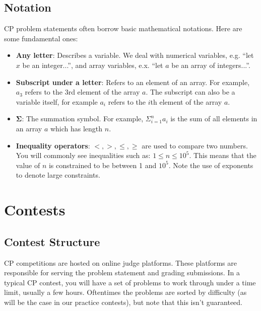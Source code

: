 \documentclass{article}
\begin{document}
\subsection {Notation}
CP problem statements often borrow basic mathematical notations. Here are some fundamental ones:
\begin{itemize}
    \item \textbf{Any letter}: Describes a variable. We deal with numerical variables, e.g. ``let $x$ be an integer...'', and array variables, e.x. ``let $a$ be an array of integers...''.
    \item \textbf{Subscript under a letter}: Refers to an element of an array. For example, $a_3$ refers to the 3rd element of the array $a$. The subscript can also be a variable itself, for example $a_i$ refers to the $i$th element of the array $a$.
    \item $\mathbf{\Sigma}$: The summation symbol. For example, $\Sigma_{i=1}^{n} a_i$ is the sum of all elements in an array $a$ which has length $n$.
    \item \textbf{Inequality operators}: $<, >, \leq, \geq$ are used to compare two numbers. You will commonly see inequalities such as: $1\leq n\leq 10^5$. This means that the value of $n$ is constrained to be between 1 and $10^5$. Note the use of exponents to denote large constraints.
\end{itemize}
\section{Contests}
\subsection{Contest Structure}
CP competitions are hosted on online judge platforms. These platforms are responsible for serving the problem statement and grading submissions. In a typical CP contest, you will have a set of problems to work through under a time limit, usually a few hours. Oftentimes the problems are sorted by difficulty (as will be the case in our practice contests), but note that this isn't guaranteed.
\end{document}
